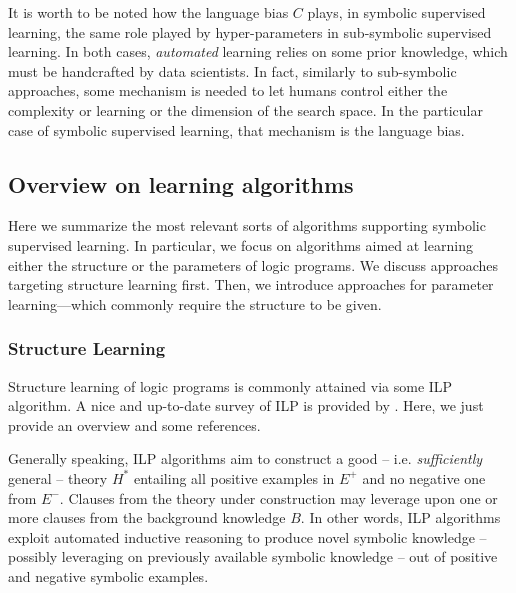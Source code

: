 \documentclass[12pt,a4paper,openright,twoside]{book}
\begin{document}
It is worth to be noted how the language bias $C$ plays, in symbolic supervised learning, the same role played by hyper-parameters in sub-symbolic supervised learning.
%
In both cases, \emph{automated} learning relies on some prior knowledge, which must be handcrafted by data scientists.
%
In fact, similarly to sub-symbolic approaches, some mechanism is needed to let humans control either the complexity or learning or the dimension of the search space.
%
In the particular case of symbolic supervised learning, that mechanism is the language bias.

\subsection{Overview on learning algorithms}

Here we summarize the most relevant sorts of algorithms supporting symbolic supervised learning.
%
In particular, we focus on algorithms aimed at learning either the structure or the parameters of logic programs.
%
We discuss approaches targeting structure learning first.
%
Then, we introduce approaches for parameter learning---which commonly require the structure to be given.

\subsubsection{Structure Learning}


Structure learning of logic programs is commonly attained via some ILP algorithm.
%
A nice and up-to-date survey of ILP is provided by \cite{CropperD2020}.
%
Here, we just provide an overview and some references.

Generally speaking, ILP algorithms aim to construct a good -- i.e. \emph{sufficiently} general -- theory $H^*$ entailing all positive examples in $E^+$ and no negative one from $E^-$.
%
Clauses from the theory under construction may leverage upon one or more clauses from the background knowledge $B$.
%
In other words, ILP algorithms exploit automated inductive reasoning to produce novel symbolic knowledge -- possibly leveraging on previously available symbolic knowledge -- out of positive and negative symbolic examples.
\end{document}
